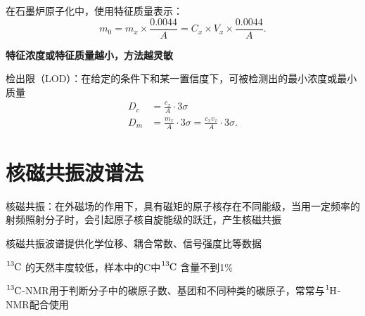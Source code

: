 \begin{notation}
在石墨炉原子化中，使用特征质量表示：
\[
    m_0 = m_{x} \times \frac{0.0044}{A} = C_{x} \times V_{x} \times \frac{0.0044}{A}
.\]
\end{notation}
\textbf{特征浓度或特征质量越小，方法越灵敏}
\begin{notation}
    检出限（LOD）：在给定的条件下和某一置信度下，可被检测出的最小浓度或最小质量
    \begin{align*}
        D_{c} &= \frac{c_{x}}{A}\cdot 3\sigma\\
        D_{m} &= \frac{m_{x}}{A}\cdot 3\sigma = \frac{c_{x}v_{x}}{A}\cdot 3\sigma
    .\end{align*}
\end{notation}
\section{核磁共振波谱法}%
\label{sec:核磁共振波谱法}
\begin{defi}
    核磁共振：在外磁场的作用下，具有磁矩的原子核存在不同能级，当用一定频率的射频照射分子时，会引起原子核自旋能级的跃迁，产生核磁共振
\end{defi}
核磁共振波谱提供化学位移、耦合常数、信号强度比等数据
\begin{notation}
    $\ce{^{13}C}$ 的天然丰度较低，样本中的C中$\ce{^{13}C}$ 含量不到1\%
\end{notation}
\begin{notation}
    $\ce{^{13}C}$-NMR用于判断分子中的碳原子数、基团和不同种类的碳原子，常常与$\ce{^{1}H}$-NMR配合使用
\end{notation}
